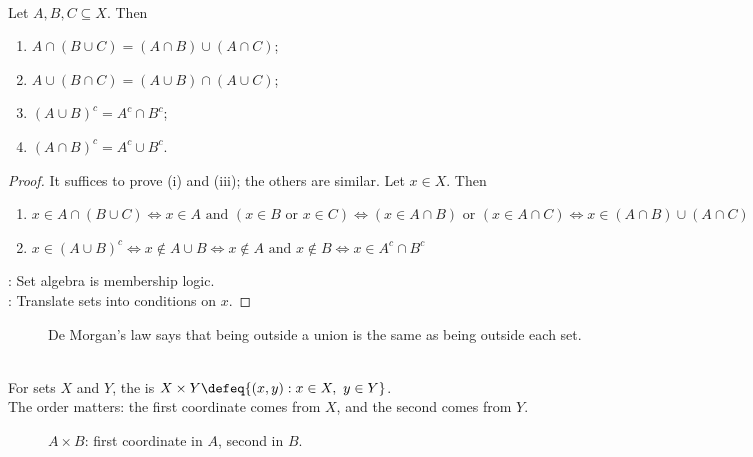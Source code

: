 \begin{proposition} \label{prop:analysis-set-algebra} \\
Let $A,B,C\subseteq X$. Then
\begin{enumerate}[label=(\roman*)]
\setlength{\itemsep}{0pt}
\item $A\cap(B\cup C)=(A\cap B)\cup(A\cap C)$;
\item $A\cup(B\cap C)=(A\cup B)\cap(A\cup C)$;
\item $(A\cup B)^c=A^c\cap B^c$;
\item $(A\cap B)^c=A^c\cup B^c$.
\end{enumerate}
\begin{proof}
It suffices to prove (i) and (iii); the others are similar. Let $x\in X$. Then
\begin{enumerate}[label=(\roman*)]
\setlength{\itemsep}{0pt}
\item[(i)] $x\in A\cap(B\cup C) \Longleftrightarrow x\in A \text{ and } (x\in B \text{ or } x\in C) \Longleftrightarrow (x\in A\cap B) \text{ or } (x\in A\cap C) \Longleftrightarrow x\in (A\cap B)\cup(A\cap C)$
\item[(iii)] $x\in (A\cup B)^c \Longleftrightarrow x\notin A\cup B \Longleftrightarrow x\notin A \text{ and } x\notin B \Longleftrightarrow x\in A^c\cap B^c$
\end{enumerate}
: Set algebra is membership logic.\\
: Translate sets into conditions on $x$.
\end{proof}
\end{proposition}

\begin{figure}[H]
    \centering
    
    \caption{De Morgan's law says that being outside a union is the same as being outside each set.}
    \label{fig:de-morgan-complement-union}
\end{figure}

\begin{definition} \label{def:cartesian-product} \\
For sets $X$ and $Y$, the  is $X\times Y\defeq\{(x,y):x\in X,\ y\in Y\}$.\\
The order matters: the first coordinate comes from $X$, and the second comes from $Y$.
\end{definition}

\begin{figure}[H]
    \centering
    
    \caption{$A\times B$: first coordinate in $A$, second in $B$.}
    \label{fig:cartesian-product-rectangle}
\end{figure}

